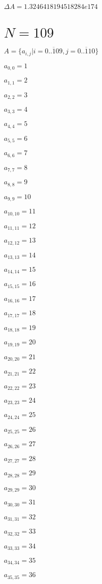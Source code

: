 \documentclass[a4paper,12pt]{article}
\begin{document}
$\Delta A = 1.3246418194518284e174$



\section{ $N = 109$ }
$A = \{ a _{ i, j } | i = \overline { 0..109 }, j = \overline { 0..110 } \}$

$a _{ 0, 0 } = 1$

$a _{ 1, 1 } = 2$

$a _{ 2, 2 } = 3$

$a _{ 3, 3 } = 4$

$a _{ 4, 4 } = 5$

$a _{ 5, 5 } = 6$

$a _{ 6, 6 } = 7$

$a _{ 7, 7 } = 8$

$a _{ 8, 8 } = 9$

$a _{ 9, 9 } = 10$

$a _{ 10, 10 } = 11$

$a _{ 11, 11 } = 12$

$a _{ 12, 12 } = 13$

$a _{ 13, 13 } = 14$

$a _{ 14, 14 } = 15$

$a _{ 15, 15 } = 16$

$a _{ 16, 16 } = 17$

$a _{ 17, 17 } = 18$

$a _{ 18, 18 } = 19$

$a _{ 19, 19 } = 20$

$a _{ 20, 20 } = 21$

$a _{ 21, 21 } = 22$

$a _{ 22, 22 } = 23$

$a _{ 23, 23 } = 24$

$a _{ 24, 24 } = 25$

$a _{ 25, 25 } = 26$

$a _{ 26, 26 } = 27$

$a _{ 27, 27 } = 28$

$a _{ 28, 28 } = 29$

$a _{ 29, 29 } = 30$

$a _{ 30, 30 } = 31$

$a _{ 31, 31 } = 32$

$a _{ 32, 32 } = 33$

$a _{ 33, 33 } = 34$

$a _{ 34, 34 } = 35$

$a _{ 35, 35 } = 36$
\end{document}
